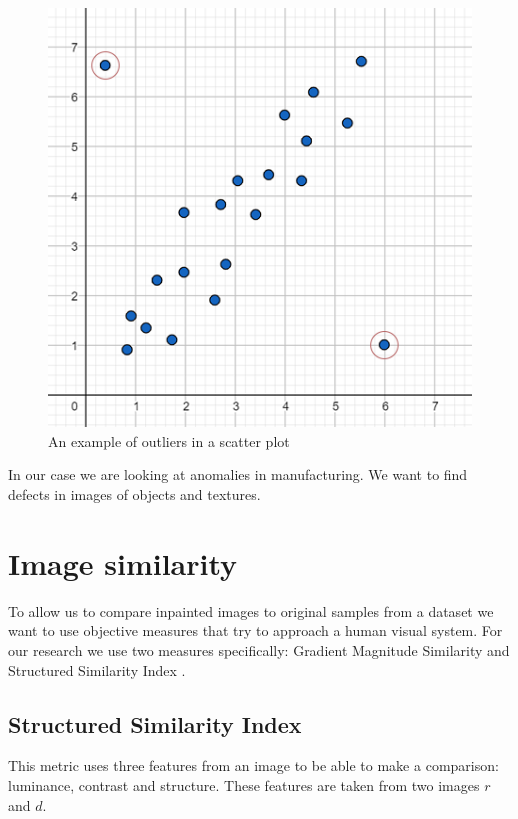 \begin{figure}[H]
\centering
\includegraphics[]{imgs/outliers-example.png}
\caption{An example of outliers in a scatter plot}
\label{fig:prelim:outliers-example}
\end{figure}

In our case we are looking at anomalies in manufacturing. We want to find defects in images of objects and textures.

\section{Image similarity}
\label{sec:prelim:image-similarity}

To allow us to compare inpainted images to original samples from a dataset we want to use objective measures that try to approach a human visual system. For our research we use two measures specifically: Gradient Magnitude Similarity \cite{xue_gradient_2014, zhang_gradient_2017} and Structured Similarity Index \cite{wang_image_2004}.

\subsection{Structured Similarity Index}

This metric uses three features from an image to be able to make a comparison: luminance, contrast and structure. These features are taken from two images $r$ and $d$.


